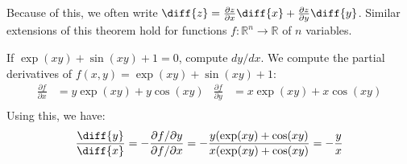 \documentclass[crop=false,class=book,oneside]{standalone}
\begin{document}
        Because of this, we often write
        $\diff{z}=\frac{\partial{z}}{\partial{x}}\diff{x}%
         +\frac{\partial{z}}{\partial{y}}\diff{y}$.
        Similar extensions of this theorem hold for functions
        $f:\mathbb{R}^{n}\rightarrow\mathbb{R}$ of $n$ variables.
        \begin{example}
            If $\exp(xy)+\sin(xy)+1=0$, compute $dy/dx$. We compute
            the partial derivatives of $f(x,y)=\exp(xy)+\sin(xy)+1$:
            \begin{align*}
                \frac{\partial{f}}{\partial{x}}
                &=y\exp(xy)+y\cos(xy)
                &
                \frac{\partial{f}}{\partial{y}}
                &=x\exp(xy)+x\cos(xy)\\
            \end{align*}
            Using this, we have:
            \begin{equation*}
                \frac{\diff{y}}{\diff{x}}
                =-\frac{\partial{f}/\partial{y}}{\partial{f}/\partial{x}}
                =-\frac{y(\exp(xy)+\cos(xy)}{x(\exp(xy)+\cos(xy)}
                =-\frac{y}{x}
            \end{equation*}
        \end{example}
\end{document}
